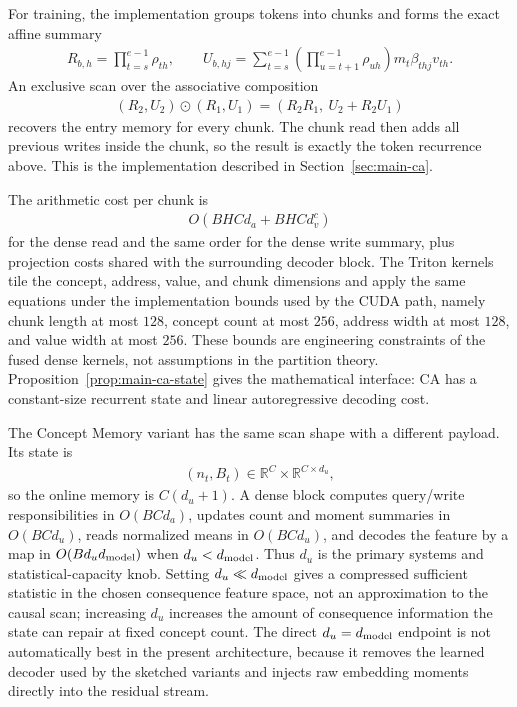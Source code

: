 For training, the implementation groups tokens into chunks and forms the exact affine summary
\begin{align*}
R_{b,h}=\prod_{t=s}^{e-1}\rho_{th},
\qquad
U_{b,hj}=
\sum_{t=s}^{e-1}
\left(\prod_{u=t+1}^{e-1}\rho_{uh}\right)
m_t\beta_{thj}v_{th}.
\end{align*}
An exclusive scan over the associative composition
\begin{align*}
(R_2,U_2)\odot(R_1,U_1)=(R_2R_1,\ U_2+R_2U_1)
\end{align*}
recovers the entry memory for every chunk. The chunk read then adds all previous writes inside the chunk, so the result is exactly the token recurrence above. This is the implementation described in Section~\ref{sec:main-ca}.

The arithmetic cost per chunk is
\begin{align*}
O(B H C d_a + B H C d_v^c)
\end{align*}
for the dense read and the same order for the dense write summary, plus projection costs shared with the surrounding decoder block. The Triton kernels tile the concept, address, value, and chunk dimensions and apply the same equations under the implementation bounds used by the CUDA path, namely chunk length at most $128$, concept count at most $256$, address width at most $128$, and value width at most $256$. These bounds are engineering constraints of the fused dense kernels, not assumptions in the partition theory. Proposition~\ref{prop:main-ca-state} gives the mathematical interface: CA has a constant-size recurrent state and linear autoregressive decoding cost.

The Concept Memory variant has the same scan shape with a different payload. Its state is
\begin{align*}
(n_t,B_t)\in\mathbb{R}^{C}\times\mathbb{R}^{C\times d_u},
\end{align*}
so the online memory is $C(d_u+1)$. A dense block computes query/write responsibilities in $O(B C d_a)$, updates count and moment summaries in $O(B C d_u)$, reads normalized means in $O(B C d_u)$, and decodes the feature by a map in $O(B d_u d_{\rm model})$ when $d_u<d_{\rm model}$. Thus $d_u$ is the primary systems and statistical-capacity knob. Setting $d_u\ll d_{\rm model}$ gives a compressed sufficient statistic in the chosen consequence feature space, not an approximation to the causal scan; increasing $d_u$ increases the amount of consequence information the state can repair at fixed concept count. The direct $d_u=d_{\rm model}$ endpoint is not automatically best in the present architecture, because it removes the learned decoder used by the sketched variants and injects raw embedding moments directly into the residual stream.

